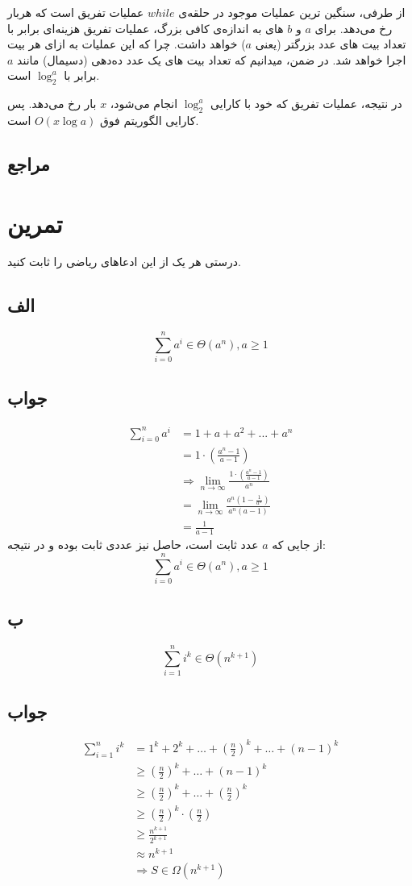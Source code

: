 \documentclass[]{article}
\begin{document}
از طرفی، سنگین ترین عملیات موجود در حلقه‌ی
$while$
عملیات تفریق است که هربار رخ می‌دهد.
برای
$a$
و
$b$
های به اندازه‌ی کافی بزرگ، عملیات تفریق هزینه‌ای برابر با تعداد بیت های عدد بزرگتر (یعنی
$a$)
خواهد داشت. چرا که این عملیات به ازای هر بیت اجرا خواهد شد.
در ضمن، میدانیم که تعداد بیت های یک عدد ده‌دهی (دسیمال) مانند 
$a$
برابر با 
$\log_2^a$
است. 

در نتیجه، 
عملیات تفریق که خود با کارایی 
$\log_2^a$
انجام می‌شود،
$x$
بار رخ می‌دهد.
پس کارایی الگوریتم فوق
$O(x\log{a})$
است.
\subsection*{مراجع}

\pagebreak
\section{تمرین}
درستی هر یک از این ادعاهای ریاضی را ثابت کنید.
\subsection{الف}
$$\displaystyle \sum_{i = 0}^n a^i \in \Theta(a^n), a \ge 1$$
\subsection*{جواب}
\begin{align}
    \sum_{i = 0}^n a^i &= 1 + a + a^2 + ... + a^n\\
    &= 1 \cdot \left( \frac{a^n - 1}{a - 1}\right)\\
    &\Rightarrow \lim_{n \to \infty} \frac{1 \cdot \left( \frac{a^n - 1}{a - 1}\right)}{a^n}\\
    &= \lim_{n \to \infty} \frac{a^n \left(1 - \frac{1}{a^n}\right)}{a^n(a-1)}\\
    &= \frac{1}{a - 1}
\end{align}
از جایی که
$a$
عدد ثابت است، حاصل نیز عددی ثابت بوده و در نتیجه:
$$\displaystyle \sum_{i = 0}^n a^i \in \Theta(a^n), a \ge 1$$

\pagebreak
\subsection{ب}
$$\displaystyle \sum_{i = 1}^n i^k \in \Theta(n^{k+1})$$
\subsection*{جواب}
\begin{align}
    \sum_{i=1}^n i^k &= 1^k + 2^k + \ldots + \left(\frac{n}{2}\right)^k + \ldots + (n-1)^k\\
    &\geq (\frac{n}{2})^k + \ldots + (n-1)^k\\
    &\geq (\frac{n}{2})^k + \ldots + (\frac{n}{2})^k\\
    &\geq (\frac{n}{2})^k \cdot (\frac{n}{2})\\
    &\geq \frac{n^{k+1}}{2^{k+1}}\\
    &\approx n^{k+1}\\
    &\Rightarrow S \in \Omega(n^{k+1})
\end{align}
\end{document}
